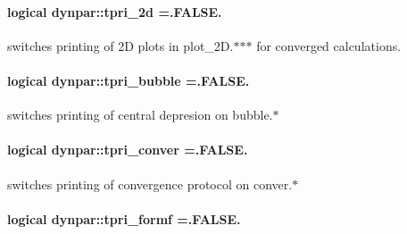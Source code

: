 \paragraph[{\texorpdfstring{tpri\+\_\+2d}{tpri_2d}}]{\setlength{\rightskip}{0pt plus 5cm}logical dynpar\+::tpri\+\_\+2d =.F\+A\+L\+S\+E.}\hypertarget{namespacedynpar_a07923fcee00bb618e690f652ec5ba62b}{}\label{namespacedynpar_a07923fcee00bb618e690f652ec5ba62b}


switches printing of 2D plots in \textquotesingle{}plot\+\_\+2D.$\ast$$\ast$$\ast$\textquotesingle{} for converged calculations. 

\paragraph[{\texorpdfstring{tpri\+\_\+bubble}{tpri_bubble}}]{\setlength{\rightskip}{0pt plus 5cm}logical dynpar\+::tpri\+\_\+bubble =.F\+A\+L\+S\+E.}\hypertarget{namespacedynpar_aa0043c33177eb376646420545d40b387}{}\label{namespacedynpar_aa0043c33177eb376646420545d40b387}


switches printing of central depresion on \textquotesingle{}bubble.$\ast$\textquotesingle{} 

\paragraph[{\texorpdfstring{tpri\+\_\+conver}{tpri_conver}}]{\setlength{\rightskip}{0pt plus 5cm}logical dynpar\+::tpri\+\_\+conver =.F\+A\+L\+S\+E.}\hypertarget{namespacedynpar_a96bc04198ad8726fd16f53a6f61c2f7a}{}\label{namespacedynpar_a96bc04198ad8726fd16f53a6f61c2f7a}


switches printing of convergence protocol on \textquotesingle{}conver.$\ast$\textquotesingle{} 

\paragraph[{\texorpdfstring{tpri\+\_\+formf}{tpri_formf}}]{\setlength{\rightskip}{0pt plus 5cm}logical dynpar\+::tpri\+\_\+formf =.F\+A\+L\+S\+E.}\hypertarget{namespacedynpar_a588c8d0002ec334ca2215ec00c6f3724}{}\label{namespacedynpar_a588c8d0002ec334ca2215ec00c6f3724}


